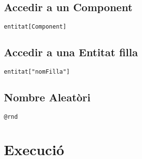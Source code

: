 \subsection{Accedir a un Component}

\begin{verbatim}
entitat[Component]
\end{verbatim}

\subsection{Accedir a una Entitat filla}

\begin{verbatim}
entitat["nomFilla"]
\end{verbatim}

\subsection{Nombre Aleatòri}

\begin{verbatim}
@rnd
\end{verbatim}

\section{Execució}